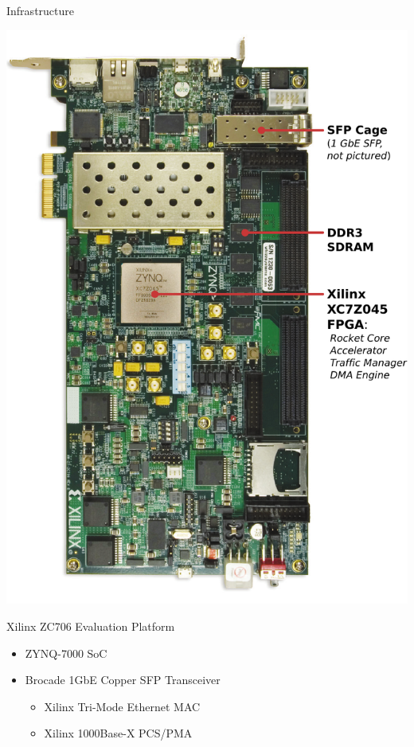 \begin{block}{Infrastructure}
\footnotesize

\begin{minipage}{0.4\linewidth}
\includegraphics[width=\linewidth]{img/zc706.pdf}
\end{minipage}
\hfill
\begin{minipage}{0.55\linewidth}
\alert{Xilinx ZC706 Evaluation Platform}
\begin{itemize}
\item ZYNQ-7000 SoC
\item Brocade 1GbE Copper SFP Transceiver
	\begin{itemize}
	\footnotesize
        \item Xilinx Tri-Mode Ethernet MAC
        \item Xilinx 1000Base-X PCS/PMA
	\end{itemize}

\end{itemize}
\end{minipage}
\end{block}
